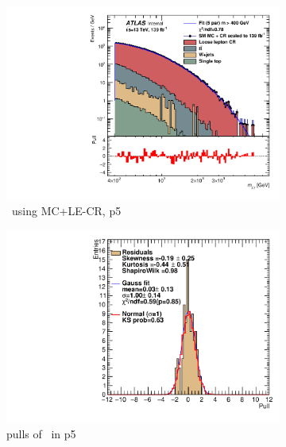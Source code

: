 \begin{figure}[H]
\begin{subfigure}[h]{0.38\linewidth}
    \includegraphics[scale=0.3]{figs/ch6/fit/variable_nosmooth/p5/10PB/output_SMMCplusCR_Mjg_p5.pdf}%
     \caption{\mjph \ using MC+LE-CR, p5}
     \end{subfigure}
     \hfill
    \begin{subfigure}[h]{0.4\linewidth}
    \includegraphics[scale=0.32]{figs/ch6/fit/variable_nosmooth/p5/10PB/pull_SMMCplusCR_Mjg_p5.pdf}%
    \caption{pulls of \mjph \ in p5}
    \end{subfigure}
    \hfill
    \begin{subfigure}[h]{0.38\linewidth}

\end{subfigure}
\end{figure}
